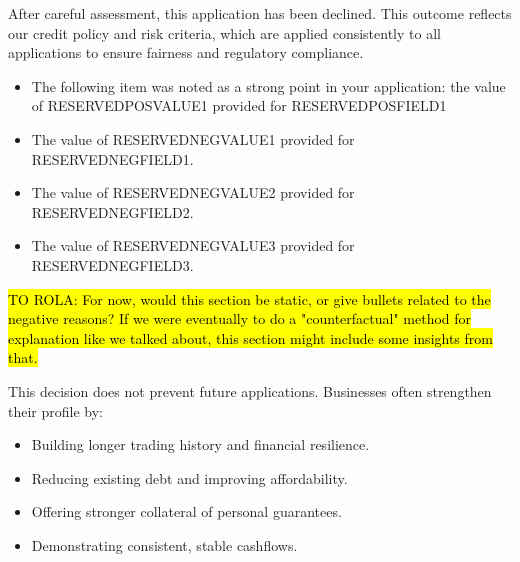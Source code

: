 \documentclass[a4paper,12pt]{article} %
\begin{document}
	
\bigskip

\bigskip

\noindent After careful assessment, this application has been declined.
This outcome reflects our credit policy and risk criteria, which are applied consistently to all
applications to ensure fairness and regulatory compliance.

\bigskip
\noindent %
\makebox[\linewidth]{\rule{\textwidth}{0.4pt}} %
\bigskip

\begin{itemize}
	\item The following item was noted as a strong point in your application:  the value of RESERVEDPOSVALUE1 provided for RESERVEDPOSFIELD1
\end{itemize}

\bigskip
\noindent %
\makebox[\linewidth]{\rule{\textwidth}{0.4pt}} %
\bigskip

\bigskip

\begin{itemize}
	\item  The value of RESERVEDNEGVALUE1 provided for RESERVEDNEGFIELD1.
	\item  The value of RESERVEDNEGVALUE2 provided for RESERVEDNEGFIELD2.
	\item  The value of RESERVEDNEGVALUE3 provided for RESERVEDNEGFIELD3.
\end{itemize}

\bigskip
\noindent %
\makebox[\linewidth]{\rule{\textwidth}{0.4pt}}
\bigskip

\bigskip

\noindent \hl{TO ROLA: For now, would this section be static, or give bullets related to the negative reasons?  If we were eventually to do a "counterfactual" method for explanation like we talked about, this section might include some insights from that.\\ \bigskip}


\noindent This decision does not prevent future applications. Businesses often strengthen their profile by:
\begin{itemize}
	\item Building longer trading history and financial resilience.
	\item  Reducing existing debt and improving affordability.
	\item  Offering stronger collateral of personal guarantees.
	\item  Demonstrating consistent, stable cashflows.
\end{itemize}
\end{document}
